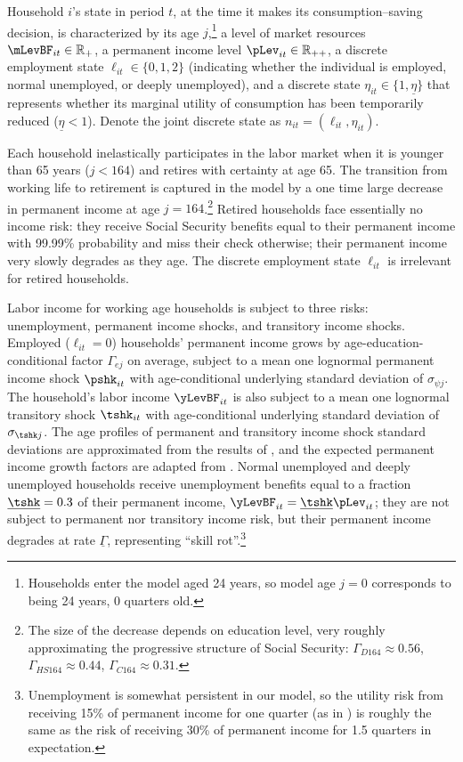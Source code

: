 \documentclass[./ConsumptionResponse]{subfiles}
\begin{document}
Household $i$'s state in period $t$, at the time it makes its consumption--saving decision, is characterized by its age $j$,\footnote{Households enter the model aged 24 years, so model age $j=0$ corresponds to being 24 years, 0 quarters old.} a level of market resources $\mLevBF_{it} \in \mathbb{R}_+$, a permanent income level $\pLev_{it} \in \mathbb{R}_{++}$, a discrete employment state $\ell_{it} \in \{0,1,2\}$ (indicating whether the individual is employed, normal unemployed, or deeply unemployed), and a discrete state $\eta_{it} \in \{1,\underline{\eta}\}$ that represents whether its marginal utility of consumption has been temporarily reduced ($\underline{\eta} < 1$).
Denote the joint discrete state as $n_{it} = (\ell_{it},\eta_{it})$.

Each household inelastically participates in the labor market when it is younger than 65 years ($j < 164$) and retires with certainty at age 65.
The transition from working life to retirement is captured in the model by a one time large decrease in permanent income at age $j=164$.\footnote{The size of the decrease depends on education level, very roughly approximating the progressive structure of Social Security: $\Gamma_{D164} \approx 0.56$, $\Gamma_{HS164} \approx 0.44$, $\Gamma_{C164} \approx 0.31$.}
Retired households face essentially no income risk: they receive Social Security benefits equal to their permanent income with 99.99\% probability and miss their check otherwise; their permanent income very slowly degrades as they age.
The discrete employment state $\ell_{it}$ is irrelevant for retired households.

Labor income for working age households is subject to three risks: unemployment, permanent income shocks, and transitory income shocks.
Employed ($\ell_{it}=0$) households' permanent income grows by age-education-conditional factor $\Gamma_{ej}$ on average, subject to a mean one lognormal permanent income shock $\pshk_{it}$ with age-conditional underlying standard deviation of $\sigma_{\psi j}$.
The household's labor income $\yLevBF_{it}$ is also subject to a mean one lognormal transitory shock $\tshk_{it}$ with age-conditional underlying standard deviation of $\sigma_{\tshk j}$.
The age profiles of permanent and transitory income shock standard deviations are approximated from the results of \cite{SabelhausSong}, and the expected permanent income growth factors are adapted from \cite{Cagetti}.
Normal unemployed and deeply unemployed households receive unemployment benefits equal to a fraction $\underline{\tshk}=0.3$ of their permanent income, $\yLevBF_{it} = \underline{\tshk} \pLev_{it}$; they are not subject to permanent nor transitory income risk, but their permanent income degrades at rate $\underline{\Gamma}$, representing ``skill rot''.\footnote{Unemployment is somewhat persistent in our model, so the utility risk from receiving 15\% of permanent income for one quarter (as in \cite{cstwMPC}) is roughly the same as the risk of receiving 30\% of permanent income for 1.5 quarters in expectation.}
\end{document}
